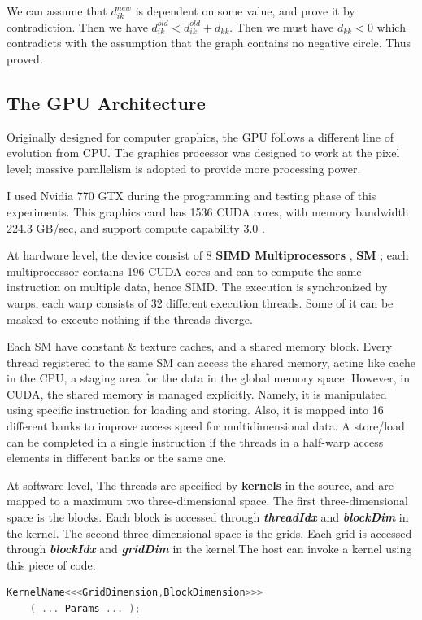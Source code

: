 \documentclass[12pt,a4paper]{article}
\newcommand{\func}[1]{{\bfseries \slshape \nobreakdash #1}}
\newcommand{\keyword}[1]{{\bfseries \nobreakdash #1}}
\begin{document}
We can assume that $d_{ik}^{new}$ is dependent on some value, and prove it by contradiction. Then we have $d_{ik}^{old} < d_{ik}^{old}+d_{kk}$. Then we must have $d_{kk}<0$ which contradicts with the assumption that the graph contains no negative circle. Thus proved.

\subsection{The GPU Architecture}

Originally designed for computer graphics, the GPU follows a different line of evolution from CPU. The graphics processor was designed to work at the pixel level; massive parallelism is adopted to provide more processing power. 

I used Nvidia 770 GTX during the programming and testing phase of this experiments. This graphics card has 1536 CUDA cores, with memory bandwidth 224.3 GB/sec, and support compute capability 3.0 \cite{GTX770}.

At hardware level, the device consist of 8 \keyword{SIMD Multiprocessors} , \keyword{SM} ; each multiprocessor contains 196 CUDA cores and can to compute the same instruction on multiple data, hence SIMD. The execution is synchronized by warps; each warp consists of 32 different execution threads. Some of it can be masked to execute nothing if the threads diverge\cite{CBEST}. 

Each SM have constant \& texture caches, and a shared memory block. Every thread registered to the same SM can access the shared memory, acting like cache in the CPU, a staging area for the data in the global memory space. However, in CUDA, the shared memory is managed explicitly. Namely, it is manipulated using specific instruction for loading and storing. Also, it is mapped into 16 different banks to improve access speed for multidimensional data. A store/load can be completed in a single instruction if the threads in a half-warp access elements in different banks or the same one\cite{CUDAC}.

At software level, The threads are specified by \keyword{kernels} in the source, and are mapped to a maximum two three-dimensional space. The first three-dimensional space is the blocks. Each block is accessed through \func{threadIdx} and \func{blockDim} in the kernel. The second three-dimensional space is the grids. Each grid is accessed through \func{blockIdx} and \func{gridDim} in the kernel.The host can invoke a kernel using this piece of code\cite{CUDAC}:
\begin{lstlisting}[frame=none,language=C]
KernelName<<<GridDimension,BlockDimension>>>
	( ... Params ... );
\end{lstlisting}
\end{document}

